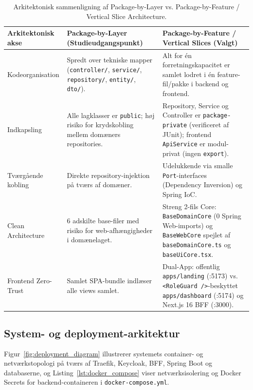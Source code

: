 \documentclass[11pt,a4paper]{article}
\begin{document}
\begin{table}[htbp]
\begin{table}[htbp]
\centering
\footnotesize
\begin{tabularx}{\textwidth}{P{3.0cm} Y Y}
\toprule
\textbf{Arkitektonisk akse} & \textbf{Package-by-Layer (Studieudgangspunkt)} & \textbf{Package-by-Feature / Vertical Slices (Valgt)} \\
\midrule
Kodeorganisation & Spredt over tekniske mapper (\texttt{controller/}, \texttt{service/}, \texttt{repository/}, \texttt{entity/}, \texttt{dto/}). & Alt for én forretningskapacitet er samlet lodret i én feature-fil/pakke i backend og frontend. \\
\addlinespace
Indkapsling & Alle lagklasser er \texttt{public}; høj risiko for krydskobling mellem domæners repositories. & Repository, Service og Controller er \texttt{package-private} (verificeret af JUnit); frontend \texttt{ApiService} er modul-privat (ingen \texttt{export}). \\
\addlinespace
Tværgående kobling & Direkte repository-injektion på tværs af domæner. & Udelukkende via smalle \texttt{Port}-interfaces (Dependency Inversion) og Spring IoC. \\
\addlinespace
Clean Architecture \cite{martin2017} & 6 adskilte base-filer med risiko for web-afhængigheder i domænelaget. & Streng 2-fils Core: \texttt{BaseDomainCore} (0 Spring Web-imports) og \texttt{BaseWebCore} spejlet af \texttt{baseDomainCore.ts} og \texttt{baseUiCore.tsx}. \\
\addlinespace
Frontend Zero-Trust & Samlet SPA-bundle indlæser alle views samlet. & Dual-App: offentlig \texttt{apps/landing} (:5173) vs. \texttt{<RoleGuard />}-beskyttet \texttt{apps/dashboard} (:5174) og Next.js 16 BFF (:3000). \\
\bottomrule
\end{tabularx}
\caption{Arkitektonisk sammenligning af Package-by-Layer vs. Package-by-Feature / Vertical Slice Architecture.}
\label{tab:layer_vs_slice}
\end{table}

\subsection{System- og deployment-arkitektur}
Figur~\ref{fig:deployment_diagram} illustrerer systemets container- og netværkstopologi på tværs af Traefik, Keycloak, BFF, Spring Boot og databaserne, og Listing~\ref{lst:docker_compose} viser netværksisolering og Docker Secrets for backend-containeren i \texttt{docker-compose.yml}.


\end{table}
\end{document}
